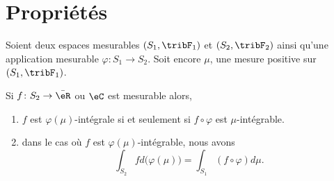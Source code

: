 \section{Propriétés}

\begin{theorem}      \label{THOooVADUooLiRfGK}
    Soient deux espaces mesurables \( (S_1,\tribF_1)\) et \( (S_2,\tribF_2)\) ainsi qu'une application mesurable \( \varphi\colon S_1\to S_2\). Soit encore \( \mu\), une mesure positive sur \( (S_1,\tribF_1)\).

    Si \( f\colon S_2\to\bar \eR\) ou \( \eC\) est mesurable alors,
    \begin{enumerate}
        \item      \label{ItemooKMBIooZpHJSS}
            \( f\) est \( \varphi(\mu)\)-intégrale si et seulement si \( f\circ\varphi\) est \( \mu\)-intégrable.
        \item       \label{ItemooLAPYooUreDEl}
            dans le cas où \( f\) est \( \varphi(\mu)\)-intégrable, nous avons
            \begin{equation}        \label{EqooSOHXooXSbdoy}
                \int_{S_2}fd\big( \varphi(\mu) \big)=\int_{S_1}(f\circ\varphi)d\mu.
            \end{equation}
    \end{enumerate}
\end{theorem}

